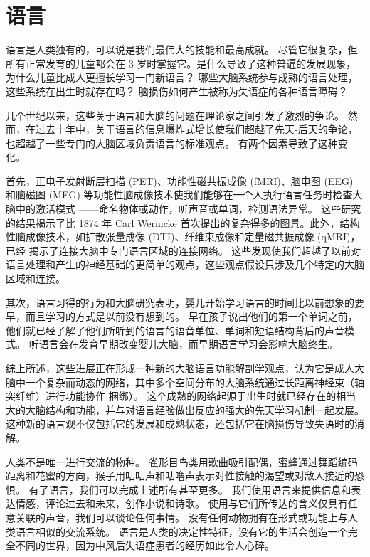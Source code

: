 \chapter{语言}

语言是人类独有的，可以说是我们最伟大的技能和最高成就。 尽管它很复杂，但所有正常发育的儿童都会在 3 岁时掌握它。是什么导致了这种普遍的发展现象，为什么儿童比成人更擅长学习一门新语言？ 哪些大脑系统参与成熟的语言处理，这些系统在出生时就存在吗？ 脑损伤如何产生被称为失语症的各种语言障碍？

几个世纪以来，这些关于语言和大脑的问题在理论家之间引发了激烈的争论。 然而，在过去十年中，关于语言的信息爆炸式增长使我们超越了先天-后天的争论，也超越了一些专门的大脑区域负责语言的标准观点。 有两个因素导致了这种变化。

首先，正电子发射断层扫描 (PET)、功能性磁共振成像 (fMRI)、脑电图 (EEG) 和脑磁图 (MEG) 等功能性脑成像技术使我们能够在一个人执行语言任务时检查大脑中的激活模式 ——命名物体或动作，听声音或单词，检测语法异常。 这些研究的结果揭示了比 1874 年 Carl Wernicke 首次提出的复杂得多的图景。此外，结构性脑成像技术，如扩散张量成像 (DTI)、纤维束成像和定量磁共振成像 (qMRI)，已经 揭示了连接大脑中专门语言区域的连接网络。 这些发现使我们超越了以前对语言处理和产生的神经基础的更简单的观点，这些观点假设只涉及几个特定的大脑区域和连接。

其次，语言习得的行为和大脑研究表明，婴儿开始学习语言的时间比以前想象的要早，而且学习的方式是以前没有想到的。 早在孩子说出他们的第一个单词之前，他们就已经了解了他们所听到的语言的语音单位、单词和短语结构背后的声音模式。 听语言会在发育早期改变婴儿大脑，而早期语言学习会影响大脑终生。

综上所述，这些进展正在形成一种新的大脑语言功能解剖学观点，认为它是成人大脑中一个复杂而动态的网络，其中多个空间分布的大脑系统通过长距离神经束（轴突纤维）进行功能协作 捆绑）。 这个成熟的网络起源于出生时就已经存在的相当大的大脑结构和功能，并与对语言经验做出反应的强大的先天学习机制一起发展。 这种新的语言观不仅包括它的发展和成熟状态，还包括它在脑损伤导致失语时的消解。

人类不是唯一进行交流的物种。 雀形目鸟类用歌曲吸引配偶，蜜蜂通过舞蹈编码距离和花蜜的方向，猴子用咕咕声和咕噜声表示对性接触的渴望或对敌人接近的恐惧。 有了语言，我们可以完成上述所有甚至更多。 我们使用语言来提供信息和表达情感，评论过去和未来，创作小说和诗歌。 使用与它们所传达的含义仅具有任意关联的声音，我们可以谈论任何事情。 没有任何动物拥有在形式或功能上与人类语言相似的交流系统。 语言是人类的决定性特征，没有它的生活会创造一个完全不同的世界，因为中风后失语症患者的经历如此令人心碎。

